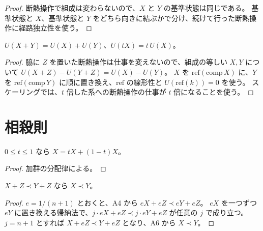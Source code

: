 \begin{proof}
  \leanok
  断熱操作で組成は変わらないので、$X$ と $Y$ の基準状態は同じである。
  基準状態と $X$、基準状態と $Y$ をどちら向きに結ぶかで分け、続けて行った断熱操作に経路独立性を使う。
\end{proof}

\begin{theorem}[内部エネルギーは示量的]
  \label{thm:energy-extensive}
  \leanok
  $U(X + Y) = U(X) + U(Y)$、$U(tX) = t\, U(X)$。
\end{theorem}

\begin{proof}
  \leanok
  脇に $Z$ を置いた断熱操作は仕事を変えないので、組成の等しい $X, Y$ について $U(X + Z) - U(Y + Z) = U(X) - U(Y)$。
  $X$ を $\mathrm{ref}(\mathrm{comp}\, X)$ に、$Y$ を $\mathrm{ref}(\mathrm{comp}\, Y)$ に順に置き換え、$\mathrm{ref}$ の線形性と $U(\mathrm{ref}(k)) = 0$ を使う。
  スケーリングでは、$t$ 倍した系への断熱操作の仕事が $t$ 倍になることを使う。
\end{proof}

\section{相殺則}

\begin{lemma}[分割と再結合 (A5)]
  \label{lem:split}
  \leanok
  $0 \le t \le 1$ なら $X = tX + (1-t)X$。
\end{lemma}

\begin{proof}
  \leanok
  加群の分配律による。
\end{proof}

\begin{theorem}[相殺則]
  \label{thm:cancel}
  \leanok
  $X + Z \prec Y + Z$ なら $X \prec Y$。
\end{theorem}

\begin{proof}
  \leanok
  $e = 1/(n+1)$ とおくと、A4 から $eX + eZ \prec eY + eZ$。
  $eX$ を一つずつ $eY$ に置き換える帰納法で、$j \cdot eX + eZ \prec j \cdot eY + eZ$ が任意の $j$ で成り立つ。
  $j = n+1$ とすれば $X + eZ \prec Y + eZ$ となり、A6 から $X \prec Y$。
\end{proof}

